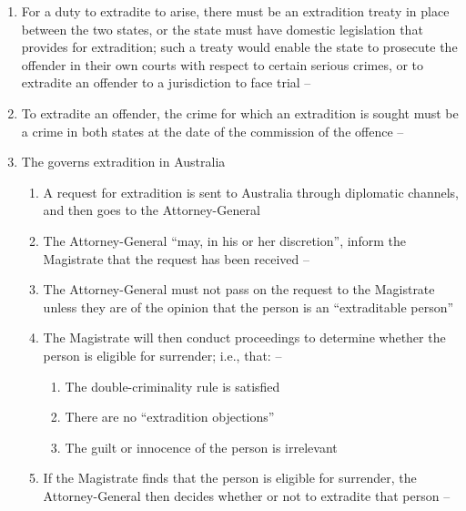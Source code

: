 \begin{enumerate}
\begin{enumerate}
\begin{enumerate}
        \end{enumerate}
        \item For a duty to extradite to arise, there must be an extradition treaty in place between the two states, or the state must have domestic legislation that provides for extradition; such a treaty would enable the state to prosecute the offender in their own courts with respect to certain serious crimes, or to extradite an offender to a jurisdiction to face trial -- 
        \item To extradite an offender, the crime for which an extradition is sought must be a crime in both states at the date of the commission of the offence -- 
        \item The  governs extradition in Australia
        \begin{enumerate}
            \item A request for extradition is sent to Australia through diplomatic channels, and then goes to the Attorney-General
            \item The Attorney-General ``may, in his or her discretion'', inform the Magistrate that the request has been received -- 
            \item The Attorney-General must not pass on the request to the Magistrate unless they are of the opinion that the person is an ``extraditable person''
            \item The Magistrate will then conduct proceedings to determine whether the person is eligible for surrender; i.e., that: -- 
            \begin{enumerate}
                \item The double-criminality rule is satisfied
                \item There are no ``extradition objections'' 
                \item The guilt or innocence of the person is irrelevant
            \end{enumerate}
            \item If the Magistrate finds that the person is eligible for surrender, the Attorney-General then decides whether or not to extradite that person -- 
        \end{enumerate}
    \end{enumerate}

\end{enumerate}
